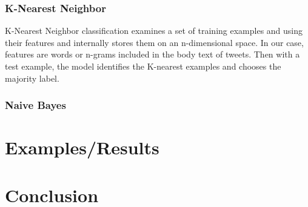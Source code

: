 \documentclass[midd]{thesis}
\begin{document}
\subsection{K-Nearest Neighbor}

K-Nearest Neighbor classification examines a set of training examples and using their features and internally stores them on an n-dimensional space. In our case, features are words or n-grams included in the body text of tweets. Then with a test example, the model identifies the K-nearest examples and chooses the majority label.

\subsection{Naive Bayes}





\chapter{Examples/Results}
\chapter{Conclusion}


\appendix
\nocite{*}


\end{document}
